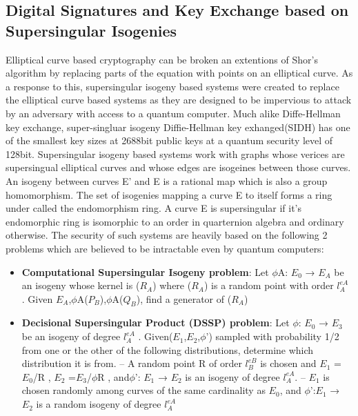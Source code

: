 \documentclass[10pt,a4paper]{article}
\begin{document}
\subsection{Digital Signatures and Key Exchange based on Supersingular Isogenies}
Elliptical curve based cryptography can be broken an extentions of Shor's algorithm by replacing parts of the equation with points on an elliptical curve. As a response to this, supersingular isogeny based systems were created to replace the elliptical curve based systems as they are designed to be impervious to attack by an adversary with access to a quantum computer. Much alike Diffe-Hellman key exchange, super-singluar isogeny Diffie-Hellman key exhanged(SIDH) has one of the smallest key sizes at 2688bit public keys at a quantum security level of 128bit.
\newline
Supersingular isogeny based systems work with graphs whose verices are supersingual elliptical curves and whose edges are isogeines between those curves. An isogeny between curves E' and E is a rational map which is also a group homomorphism.
The set of isogenies mapping a curve E to itself forms a ring under called the endomorphism ring. A curve E is supersingular if it's endomorphic ring is isomorphic to an order in  quarternion algebra and ordinary otherwise.
\newline
\newline
The security of such systems are heavily based on the following 2 problems which are believed to be intractable even by quantum computers:
\begin{itemize}
\item \textbf{Computational Supersingular Isogeny problem}:  Let \(\phi\)A: \(E_0\) → \(E_A\) be an isogeny whose kernel is (\(R_A\))	where (\(R_A\)) is a random point with order \(l^{eA}_A\) . Given \(E_A\),\(\phi\)A(\(P_B\)),\(\phi\)A(\(Q_B\)), ﬁnd a generator of (\(R_A\))	
\item \textbf{Decisional Supersingular Product (DSSP) problem}: Let \(\phi\): \(E_0\) → \(E_3\) be an isogeny of degree \(l^{eA}_A\) . Given(\(E_1\),\(E_2\),\(\phi\)') sampled with probability 1/2 from one or the other of the following distributions, determine which distribution it is from.
\subitem –  A random point R of order \(l^{eB}_B\) is chosen and \(E_1\) = \(E_0\)/{R}	, \(E_2\) =\(E_3\)/\(\phi\){R}	, and\(\phi\)': \(E_1\) → \(E_2\) is an isogeny of degree \(l^{eA}_A\).
\subitem – \(E_1\) is chosen randomly among curves of the same cardinality as \(E_0\), and \(\phi\)':\(E_1\) → \(E_2\) is a random isogeny of degree \(l^{eA}_A\)
\end{itemize} 
\end{document}
